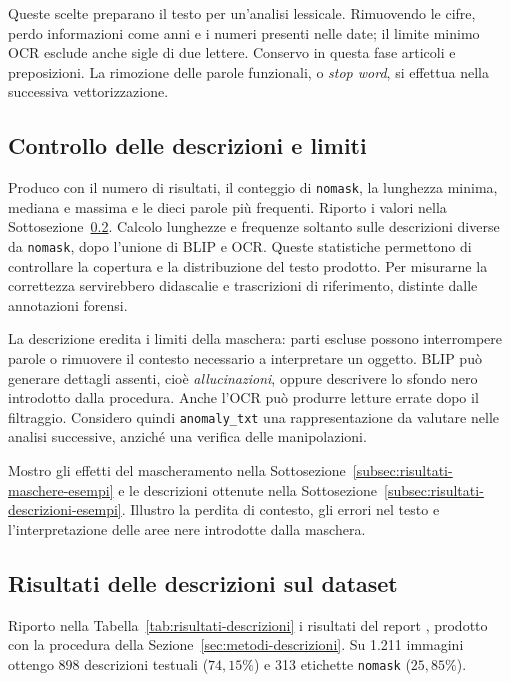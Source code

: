 Queste scelte preparano il testo per un'analisi lessicale. Rimuovendo le cifre, perdo informazioni come anni e i numeri presenti nelle date; il limite minimo OCR esclude anche sigle di due lettere. Conservo in questa fase articoli e preposizioni. La rimozione delle parole funzionali, o \emph{stop word}, si effettua nella successiva vettorizzazione.

\subsection{Controllo delle descrizioni e limiti}
\label{subsec:metodi-descrizioni-controllo}

Produco  con il numero di risultati, il conteggio di \texttt{nomask}, la lunghezza minima, mediana e massima e le dieci parole più frequenti. Riporto i valori nella Sottosezione~\ref{subsec:risultati-descrizioni}. Calcolo lunghezze e frequenze soltanto sulle descrizioni diverse da \texttt{nomask}, dopo l'unione di BLIP e OCR. Queste statistiche permettono di controllare la copertura e la distribuzione del testo prodotto. Per misurarne la correttezza servirebbero didascalie e trascrizioni di riferimento, distinte dalle annotazioni forensi.

La descrizione eredita i limiti della maschera: parti escluse possono interrompere parole o rimuovere il contesto necessario a interpretare un oggetto. BLIP può generare dettagli assenti, cioè \emph{allucinazioni}, oppure descrivere lo sfondo nero introdotto dalla procedura. Anche l'OCR può produrre letture errate dopo il filtraggio. Considero quindi \texttt{anomaly\_txt} una rappresentazione da valutare nelle analisi successive, anziché una verifica delle manipolazioni.

Mostro gli effetti del mascheramento nella Sottosezione~\ref{subsec:risultati-maschere-esempi} e le descrizioni ottenute nella Sottosezione~\ref{subsec:risultati-descrizioni-esempi}. Illustro la perdita di contesto, gli errori nel testo e l'interpretazione delle aree nere introdotte dalla maschera.

\subsection{Risultati delle descrizioni sul dataset}
\label{subsec:risultati-descrizioni}

Riporto nella Tabella~\ref{tab:risultati-descrizioni} i risultati del report , prodotto con la procedura della Sezione~\ref{sec:metodi-descrizioni}. Su 1.211 immagini ottengo 898 descrizioni testuali ($74{,}15\%$) e 313 etichette \texttt{nomask} ($25{,}85\%$).

